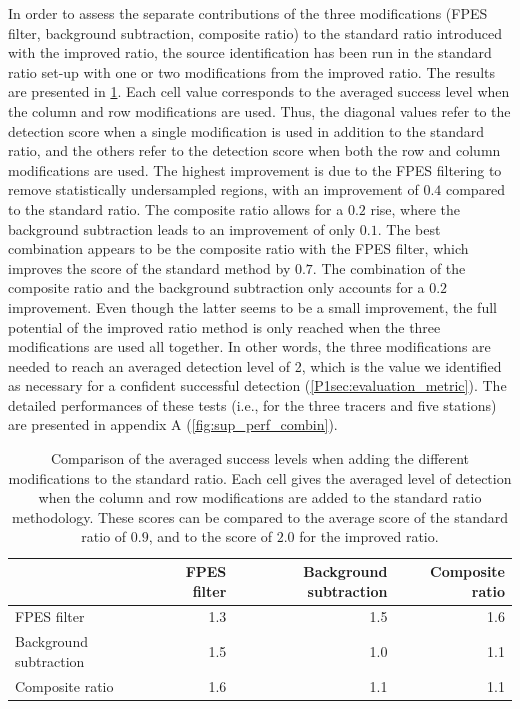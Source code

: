         In order to assess the separate contributions of the three modifications (FPES filter, background subtraction, composite ratio) to the standard ratio introduced with the improved ratio, the source identification has been run in the standard ratio set-up with one or two modifications from the improved ratio. The results are presented in \cref{P1tab:modif_compar}. Each cell value corresponds to the averaged success level when the column and row modifications are used. Thus, the diagonal values refer to the detection score when a single modification is used in addition to the standard ratio, and the others refer to the detection score when both the row and column modifications are used.
        The highest improvement is due to the FPES filtering to remove statistically undersampled regions, with an improvement of $0.4$ compared to the standard ratio. The composite ratio allows for a $0.2$ rise, where the background subtraction leads to an improvement of only $0.1$. The best combination appears to be the composite ratio with the FPES filter, which improves the score of the standard method by $0.7$. The combination of the composite ratio and the background subtraction only accounts for a $0.2$ improvement. Even though the latter seems to be a small improvement, the full potential of the improved ratio method is only reached when the three modifications are used all together.
        In other words, the three modifications are needed to reach an averaged detection level of 2, which is the value we identified as necessary for a confident successful detection (\cref{P1sec:evaluation_metric}).
        The detailed performances of these tests (i.e., for the three tracers and five stations) are presented in appendix A (\cref{fig:sup_perf_combin}).

        \begin{table}[ht]
            \centering
            \caption{Comparison of the averaged success levels when adding the different modifications to the standard ratio. Each cell gives the averaged level of detection when the column and row modifications are added to the standard ratio methodology. These scores can be compared to the average score of the standard ratio of $0.9$, and to the score of $2.0$ for the improved ratio.}
            \begin{tabular}{lrrr}
                \toprule
                & FPES filter & Background subtraction & Composite ratio \\
                \midrule
                FPES filter & 1.3 & 1.5 & 1.6\\
                Background subtraction & 1.5 & 1.0 & 1.1\\
                Composite ratio & 1.6 & 1.1 & 1.1\\
                \bottomrule
            \end{tabular}
            \label{P1tab:modif_compar}
        \end{table}

